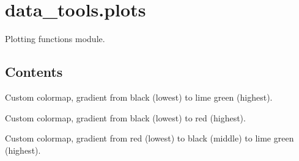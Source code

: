 \documentclass[letterpaper,10pt,english]{sphinxmanual}
\begin{document}
\label{\detokenize{plots:module-data_tools.plots}}

\section{data\_tools.plots}
\label{\detokenize{plots:data-tools-plots}}\label{\detokenize{plots::doc}}
Plotting functions module.


\subsection{Contents}
\label{\detokenize{plots:contents}}

\begin{fulllineitems}
\label{\detokenize{plots:data_tools.plots.cmap_bkgr}}
Custom colormap, gradient from black (lowest) to lime green (highest).

\end{fulllineitems}


\begin{fulllineitems}
\label{\detokenize{plots:data_tools.plots.cmap_bkrd}}
Custom colormap, gradient from black (lowest) to red (highest).

\end{fulllineitems}


\begin{fulllineitems}
\label{\detokenize{plots:data_tools.plots.cmap_rdbkgr}}
Custom colormap, gradient from red (lowest) to black (middle) to lime
green (highest).

\end{fulllineitems}
\end{document}
